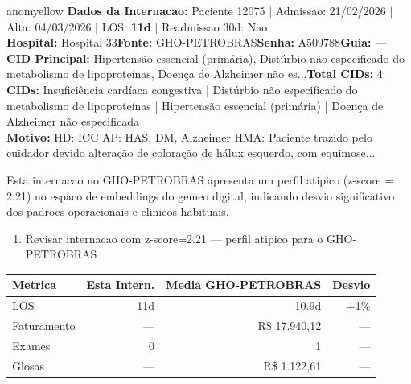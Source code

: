 \documentclass[a4paper,10pt]{article}
\begin{document}
\begin{anomalycard}[Internacao 166130 | GHO-PETROBRAS | MODERADO (z=2.21)]{anomyellow}
\textbf{Dados da Internacao:} Paciente 12075 $\mid$ Admissao: 21/02/2026 $\mid$ Alta: 04/03/2026 $\mid$ LOS: \textbf{11d} $\mid$ Readmissao 30d: Nao\\
\textbf{Hospital:} Hospital 33\quad\textbf{Fonte:} GHO-PETROBRAS\quad\textbf{Senha:} A509788\quad\textbf{Guia:} ---\\
\textbf{CID Principal:} {\small Hipertensão essencial (primária), Distúrbio não especificado do metabolismo de lipoproteínas, Doença de Alzheimer não es...}\quad\textbf{Total CIDs:} 4\\

\textbf{CIDs:} {\scriptsize Insuficiência cardíaca congestiva | Distúrbio não especificado do metabolismo de lipoproteínas | Hipertensão essencial (primária) | Doença de Alzheimer não especificada}\\

\textbf{Motivo:} {\scriptsize HD: ICC AP: HAS, DM, Alzheimer HMA: Paciente trazido pelo cuidador devido alteração de coloração de hálux esquerdo, com equimose...}\\

\vspace{2pt}\begin{tcolorbox}[colback=severityred!20,colframe=anomyellow,title={\textbf{Interpretacao de Negocio}},fonttitle=\bfseries\small,left=4pt,right=4pt,top=3pt,bottom=3pt]
{\small Esta internacao no GHO-PETROBRAS apresenta um perfil atipico (z-score = 2.21) no espaco de embeddings do gemeo digital, indicando desvio significativo dos padroes operacionais e clinicos habituais.}
\end{tcolorbox}
\begin{tcolorbox}[colback=severityyellow!30,colframe=anomorange,title={\textbf{Recomendacoes Especificas}},fonttitle=\bfseries\small,left=4pt,right=4pt,top=3pt,bottom=3pt]
\begin{enumerate}[nosep,leftmargin=16pt]
\item {\small Revisar internacao com z-score=2.21 --- perfil atipico para o GHO-PETROBRAS}
\end{enumerate}
\end{tcolorbox}
\begin{center}\begin{tabular}{l r r r}\toprule\textbf{Metrica} & \textbf{Esta Intern.} & \textbf{Media GHO-PETROBRAS} & \textbf{Desvio} \\\midrule
LOS & 11d & 10.9d & +1\% \\
Faturamento & --- & R\$ 17.940,12 & --- \\
Exames & 0 & 1 & --- \\
Glosas & --- & R\$ 1.122,61 & --- \\
\bottomrule\end{tabular}\end{center}


\end{anomalycard}
\end{document}
